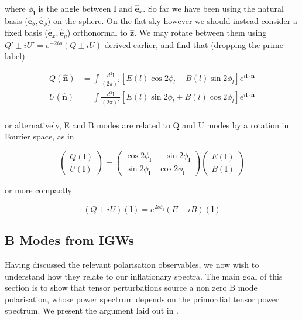\documentclass[a4paper,10pt]{article}
\renewcommand{\v}[1]{\mathbf{#1}}
\newcommand{\finttwo}[1]{\int \frac{d^2 \v{#1}}{(2\pi)^2}}
\newcommand{\unit}[1]{\hat{\v{#1}}}
\begin{document}
where $\phi_\v{l}$ is the angle between $\v{l}$ and $\unit{e}_x$. So far we have been using the natural basis ($\unit{e}_\theta, \unit{e}_\phi)$ on the sphere. On the flat sky however we should instead consider a fixed basis ($\unit{e}_x, \unit{e}_y$) orthonormal to $\unit{z}$. We may rotate between them using $Q'\pm iU' = e^{\mp 2i\phi}(Q\pm iU)$ derived earlier, and find that (dropping the prime label)

\begin{equation}\begin{split}
Q(\unit{n}) &= \finttwo{l} [E(l)\cos{2\phi_l}-B(l)\sin{2\phi_l}]  e^{i\v{l}\cdot\unit{n}}\\
U(\unit{n}) &= \finttwo{l} [E(l)\sin{2\phi_l}+B(l)\cos{2\phi_l}]  e^{i\v{l}\cdot\unit{n}}\\
\end{split}\end{equation}

or alternatively, E and B modes are related to Q and U modes by a rotation in Fourier space, as in \cite{baldauf}

\begin{equation}
\begin{pmatrix}
Q(\v{l})\\
U(\v{l}) 
\end{pmatrix}
=
\begin{pmatrix}
\cos{2\phi_\v{l}} & -\sin{2\phi_\v{l}}\\ 
\sin{2\phi_\v{l}} & \cos{2\phi_\v{l}}
\end{pmatrix}
\begin{pmatrix}
E(\v{l})\\
B(\v{l}) 
\end{pmatrix}
\end{equation}

or more compactly

\begin{equation}
(Q+iU)(\v{l}) = e^{2i\phi_\v{l}}(E+iB)(\v{l})
\label{QUrotateflat}
\end{equation}

\subsection{B Modes from IGWs}

Having discussed the relevant polarisation observables, we now wish to understand how they relate to our inflationary spectra. The main goal of this section is to show that tensor perturbations source a non zero B mode polarisation, whose power spectrum depends on the primordial tensor power spectrum. We present the argument laid out in \cite{all-sky}.\\
\end{document}
